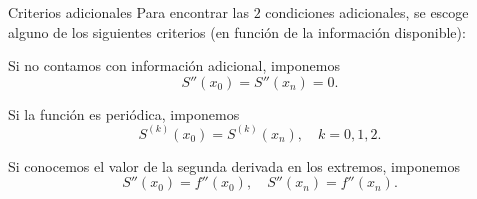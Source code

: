 \begin{frame}{Criterios adicionales}
  Para encontrar las $2$ condiciones adicionales, se escoge alguno de los
  siguientes criterios (en función de la información disponible):
  \pause
  \begin{description}[<+->]
    \item[\textit{Spline natural}] Si no contamos con información
    adicional, imponemos
    \[
      S''(x_0) = S''(x_n) = 0.
    \]
    \item[\textit{Spline periódico}] Si la función es periódica, imponemos
    \[
      S^{(k)}(x_0) = S^{(k)}(x_n), \quad k = 0, 1, 2. 
    \]
    \item[\textit{Spline} completo] Si conocemos el valor de la segunda
    derivada en los extremos, imponemos
    \[
      S''(x_0) = f''(x_0), \quad S''(x_n) = f''(x_n).
    \]
  \end{description}
\end{frame}
